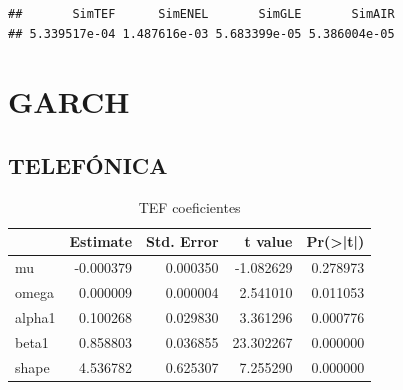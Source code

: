 \documentclass[
  12pt,
  a4paper,
  openany]{book}
\newenvironment{Shaded}{\begin{snugshade}}{\end{snugshade}}
\newcommand{\DataTypeTok}[1]{\textcolor[rgb]{0.13,0.29,0.53}{#1}}
\newcommand{\DecValTok}[1]{\textcolor[rgb]{0.00,0.00,0.81}{#1}}
\newcommand{\FloatTok}[1]{\textcolor[rgb]{0.00,0.00,0.81}{#1}}
\newcommand{\KeywordTok}[1]{\textcolor[rgb]{0.13,0.29,0.53}{\textbf{#1}}}
\newcommand{\NormalTok}[1]{#1}
\newcommand{\OperatorTok}[1]{\textcolor[rgb]{0.81,0.36,0.00}{\textbf{#1}}}
\newcommand{\StringTok}[1]{\textcolor[rgb]{0.31,0.60,0.02}{#1}}
\begin{document}
\scriptsize

\begin{Shaded}
\end{Shaded}

\begin{verbatim}
##       SimTEF      SimENEL       SimGLE       SimAIR 
## 5.339517e-04 1.487616e-03 5.683399e-05 5.386004e-05
\end{verbatim}

\begin{Shaded}
\end{Shaded}

\normalsize

\hypertarget{garch}{%
\section{GARCH}\label{garch}}

\hypertarget{telefuxf3nica}{%
\subsection{TELEFÓNICA}\label{telefuxf3nica}}

\begin{table}[!h]

\caption{\label{tab:unnamed-chunk-21}TEF coeficientes}
\centering
\begin{tabular}[t]{lrrrr}
\toprule
  &  Estimate &  Std. Error &  t value & Pr(>|t|)\\
\midrule
mu & -0.000379 & 0.000350 & -1.082629 & 0.278973\\
omega & 0.000009 & 0.000004 & 2.541010 & 0.011053\\
alpha1 & 0.100268 & 0.029830 & 3.361296 & 0.000776\\
beta1 & 0.858803 & 0.036855 & 23.302267 & 0.000000\\
shape & 4.536782 & 0.625307 & 7.255290 & 0.000000\\
\bottomrule
\end{tabular}
\end{table}
\FloatBarrier
\centering
\end{document}
